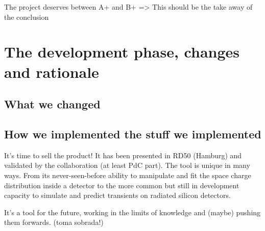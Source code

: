 The project deserves between A+ and B+ => This should be the take away of the conclusion


\section{The development phase, changes and rationale} %
\label{sec:let_s_put_the_project_in_perspective}

\subsection{What we changed}

\subsection{How we implemented the stuff we implemented}

It's time to sell the product! It has been presented in RD50 (Hamburg) and validated by the collaboration (at least PdC part). The tool is unique in many ways. From its never-seen-before ability to manipulate and fit the space charge distribution inside a detector to the more common but still in development capacity to simulate and predict transients on radiated silicon detectors.

It's a tool for the future, working in the limits of knowledge and (maybe) pushing them forwards. (toma sobrada!)

